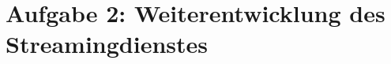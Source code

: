 \section*{Aufgabe 2: Weiterentwicklung des Streamingdienstes}


\pagebreak

\pagebreak

\pagebreak

